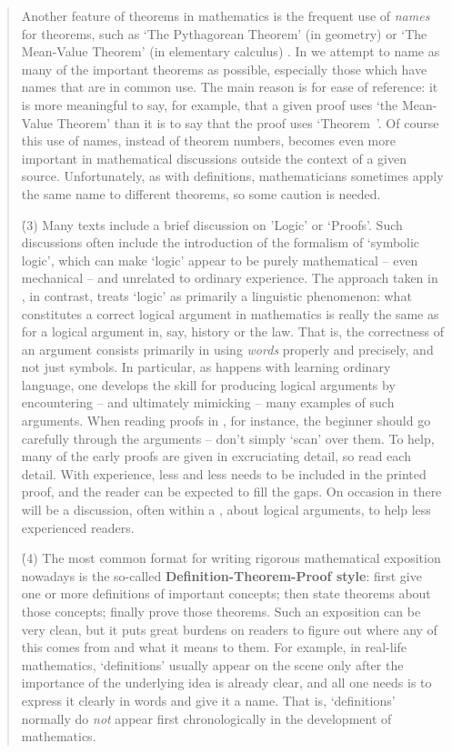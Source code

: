 \begin{quotation}
{        Another feature of theorems in mathematics is the frequent use of {\em names} for theorems,
    such as `The Pythagorean Theorem' (in geometry) or `The Mean-Value Theorem' (in elementary calculus) . In {\TheseNotes} we attempt to name as many of the important theorems as possible, 
    especially those which have names that are in common use. The main reason is for ease of reference: it is more meaningful to say, for example,
    that a given proof uses `the Mean-Value Theorem' than it is to say that the proof uses `Theorem~'.
    Of course this use of names, instead of theorem numbers, becomes even more important in mathematical discussions outside the context of a given source.
    Unfortunately, as with definitions, mathematicians sometimes apply the same name to different theorems, so some caution is needed.

\V

      \h  (3) Many texts include a brief discussion on 'Logic' or `Proofs'.
    Such discussions often include the introduction of the formalism of `symbolic logic',
    which can make `logic' appear to be purely mathematical -- even mechanical -- and unrelated to ordinary experience.
    The approach taken in {\TheseNotes}, in contrast, treats `logic' as primarily a linguistic phenomenon:
    what constitutes a correct logical argument in mathematics is really the same as for a logical argument in, say, history or the law.
    That is, the correctness of an argument consists primarily in using {\em words} properly and precisely, and not just symbols.
    In particular, as happens with learning ordinary language, one develops the skill for producing logical arguments by encountering
    -- and ultimately mimicking -- many examples of such arguments. When reading proofs in {\TheseNotes}, for instance,
    the beginner should go carefully through the arguments -- don't simply `scan' over them.
    To help, many of the early proofs are given in excruciating detail, so read each detail.
    With experience, less and less needs to be included in the printed proof, and the reader can be expected to fill the gaps.
    On occasion in {\ThisText} there will be a discussion, often within a {\Note}, about logical arguments, to help less experienced readers.

\V

    \h (4) The most common format for writing rigorous mathematical exposition nowadays is the so-called {\bf Definition-Theorem-Proof style}:
    first give one or more definitions of important concepts; then state theorems about those concepts; finally prove those theorems.
    Such an exposition can be very clean, but it puts great burdens on readers to figure out where any of this comes from and what it means to them.
    For example, in real-life mathematics, `definitions' usually appear on the scene only after the importance of the underlying idea is already clear,
    and all one needs is to express it clearly in words and give it a name. That is, `definitions' normally do {\em not} appear first chronologically in the development of mathematics.

}
\end{quotation}
